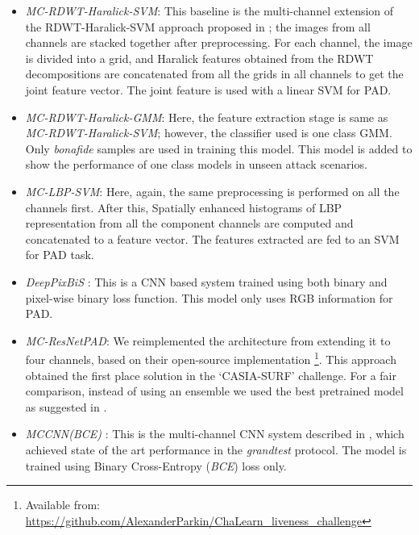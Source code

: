 \documentclass[journal]{IEEEtran}
\begin{document}
\begin{itemize}

\item \textit{MC-RDWT-Haralick-SVM}: This baseline is the multi-channel extension of the RDWT-Haralick-SVM approach proposed in \cite{agarwal2017face}; the images from all channels are stacked together after preprocessing. For each channel, the image is divided into a   grid, and Haralick \cite{haralick1979statistical} features obtained from the RDWT decompositions are concatenated from all the grids in all channels to get the joint feature vector. The joint feature is used with a linear SVM for PAD.

\item \textit{MC-RDWT-Haralick-GMM}: Here, the feature extraction stage is same as \textit{MC-RDWT-Haralick-SVM}; however, the classifier used is one class GMM. Only \textit{bonafide} samples are used in training this model. This model is added to show the performance of one class models in unseen attack scenarios.

\item \textit{MC-LBP-SVM}: Here, again, the same preprocessing is performed on all the channels first. After this, Spatially enhanced histograms of LBP representation from all the component channels are computed and concatenated to a feature vector. The features extracted are fed to an SVM for PAD task.

\item \textit{DeepPixBiS} :  This is a CNN based system \cite{george2019deep} trained using both binary and pixel-wise binary loss function. This model only uses RGB information for PAD.

\item \textit{MC-ResNetPAD}: We reimplemented the architecture from \cite{parkin2019recognizing} extending it to four channels, based on their open-source implementation \footnote{Available from: \url{https://github.com/AlexanderParkin/ChaLearn_liveness_challenge}}. This approach obtained the first place solution in the `CASIA-SURF' challenge. For a fair comparison, instead of using an ensemble we used the best pretrained model as suggested in \cite{parkin2019recognizing}.

\item \textit{MCCNN(BCE)} : This is the multi-channel CNN system described in \cite{george_mccnn_tifs2019}, which achieved state of the art performance in the \textit{grandtest} protocol. The model is trained using Binary Cross-Entropy (\textit{BCE}) loss only.
\end{itemize}
\end{document}

